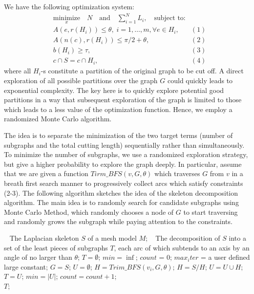 We have the following optimization system:
\begin{equation*}
\begin{aligned}
& \underset{x}{\text{minimize}} \quad N \quad \text{and} \quad \sum_{i=1}^N{L_i},
\quad \text{subject to:} \\
& A(e, r(H_i)) \leq \theta, \; i = 1, \ldots, m, \forall e \in H_i, & (1)\\
& A(n(c), r(H_i)) \leq \pi/2+ \theta, & (2)\\
& b(H_i) \geq \tau, & (3)\\
& c \cap S = c \cap H_i, & (4)
\end{aligned}
\end{equation*}
where all $H_i$-s constitute a partition of the original graph to be cut off. A direct exploration of all possible partitions over the graph $G$ could quickly leads to exponential complexity. The key here is to quickly explore potential good partitions in a way that subsequent exploration of the graph is limited to those which leads to a less value of the optimization function. Hence, we employ a randomized Monte Carlo algorithm.

The idea is to separate the minimization of the two target terms (number of subgraphs and the total cutting length) sequentially rather than simultaneously. To minimize the number of subgraphs, we use a randomized exploration strategy, but give a higher probability to explore the graph deeply. In particular, assume that we are given a function $Tirm\_BFS(v, G, \theta)$ which traverses $G$ from $v$ in a breath first search manner to progressively collect arcs which satisfy constraints (2-3). The following algorithm sketches the idea of the skeleton decomposition algorithm. The main idea is to randomly search for candidate subgraphs using Monte Carlo Method, which randomly chooses a node of $G$ to start traversing and randomly grows the subgraph while paying attention to the constraints.

\begin{algorithm}
\caption{$SkeletonMeshDecomposition(S, M)$}
\label{alg:Framwork}
\begin{algorithmic}[1]
\REQUIRE~
The Laplacian skeleton $S$ of a mesh model $M$;
\ENSURE~
The decomposition of $S$ into a set of the least pieces of subgraphs $T$, each arc of which subtends to an axis by an angle of no larger than $\theta$;
\STATE $T = \emptyset$; $min = \inf$; $count$ = 0; $max_iter$ = a user defined large constant;
\STATE  $G=S$; $U= \emptyset$;
\STATE $H = Trim\_BFS(v_i, G, \theta)$;
\STATE $H = S / H$;
\STATE $U = U \cup H$;
\STATE $T = U$;
\STATE  $min = | U | $;
\ENDIF
\ENDFOR
\ENDWHILE
\STATE $count =count + 1$;
\ENDWHILE
\label{code:fram:select} \\
\RETURN $T$;
\end{algorithmic}
\end{algorithm}


